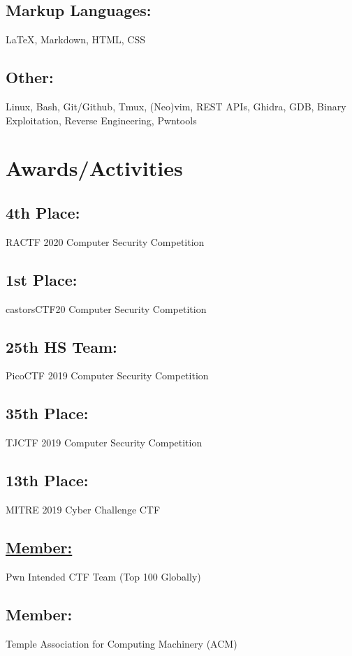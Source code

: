 \documentclass{article}
\begin{document}
\subsection{Markup Languages:}
{\LaTeX}, Markdown, HTML, CSS
\subsection{Other:}
Linux, Bash, Git/Github, Tmux, (Neo)vim, REST APIs, Ghidra, GDB, Binary Exploitation, Reverse Engineering, Pwntools

\section{Awards/Activities}
\subsection{4th Place: } RACTF 2020 Computer Security Competition
\subsection{1st Place: } castorsCTF20 Computer Security Competition
\subsection{25th HS Team: } PicoCTF 2019 Computer Security Competition
\subsection{35th Place: } TJCTF 2019 Computer Security Competition
\subsection{13th Place: } MITRE 2019 Cyber Challenge CTF
\subsection{\href{https://ctftime.org/user/66839}{Member: }} Pwn Intended CTF Team (Top 100 Globally)
\subsection{Member: } Temple Association for Computing Machinery (ACM)
\end{document}

